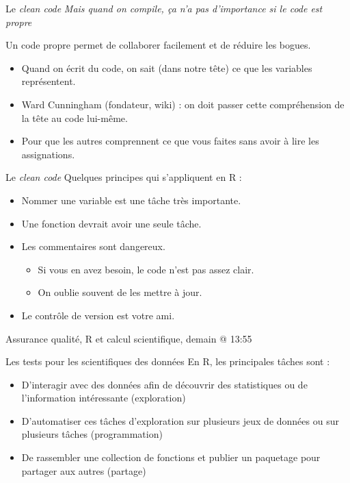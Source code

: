 \documentclass[11pt]{beamer}
\begin{document}
\begin{frame}{Le \textit{clean code}}
\textit{Mais quand on compile, ça n'a pas d'importance si le code est propre}

Un code propre permet de collaborer facilement et de réduire les bogues.
\begin{itemize}
    \item Quand on écrit du code, on sait (dans notre tête) ce que les variables représentent.
    \item Ward Cunningham (fondateur, wiki) : on doit passer cette compréhension de la tête au code lui-même.
    \item Pour que les autres comprennent ce que vous faites sans avoir à lire les assignations.
\end{itemize}
\end{frame}

\begin{frame}{Le \textit{clean code}}
Quelques principes qui s'appliquent en \textsf{R} :
\begin{itemize}
\item Nommer une variable est une tâche très importante.
\item Une fonction devrait avoir une seule tâche.
\item Les commentaires sont dangereux.
\begin{itemize}
\item Si vous en avez besoin, le code n'est pas assez clair.
\item On oublie souvent de les mettre à jour.
\end{itemize}
\item Le contrôle de version est votre ami.
\end{itemize}
Assurance qualité, R et calcul scientifique, demain @ 13:55
\end{frame}

\begin{frame}{Les tests pour les scientifiques des données}
En \textsf{R}, les principales tâches sont :
\begin{itemize}
\item D'interagir avec des données afin de découvrir des statistiques ou de l'information intéressante (exploration)
\item D'automatiser ces tâches d'exploration sur plusieurs jeux de données ou sur plusieurs tâches (programmation)
\item De rassembler une collection de fonctions et publier un paquetage pour partager aux autres (partage)
\end{itemize}
\end{frame}
\end{document}
